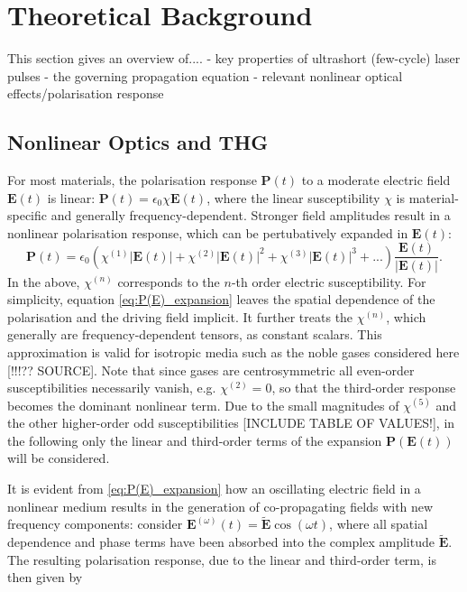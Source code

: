 \documentclass[a4paper]{jpconf}
\begin{document}
\section{Theoretical Background}
This section gives an overview of....
- key properties of ultrashort (few-cycle) laser pulses
- the governing propagation equation 
- relevant nonlinear optical effects/polarisation response

\subsection{Nonlinear Optics and THG}
For most materials, the polarisation response $\mathbf{P}(t)$ to a moderate electric field $\mathbf{E}(t)$ is linear: $\mathbf{P}(t) = \epsilon_0 \chi \mathbf{E}(t)$, where the linear susceptibility $\chi$ is material-specific and generally frequency-dependent. Stronger field amplitudes result in a nonlinear polarisation response, which can be pertubatively expanded in $\mathbf{E}(t)$:
\begin{equation}\label{eq:P(E)_expansion}
\mathbf{P}(t) = \epsilon_0 \left( \chi^{(1)}|\mathbf{E}(t)| + \chi^{(2)}|\mathbf{E}(t)|^2 +  \chi^{(3)}|\mathbf{E}(t)|^3 + ...  \right) \frac{\mathbf{E}(t)}{|\mathbf{E}(t)|}.
\end{equation}
In the above, $\chi^{(n)}$ corresponds to the $n$-th order electric susceptibility. For simplicity, equation \eqref{eq:P(E)_expansion} leaves the spatial dependence of the polarisation and the driving field implicit. It further treats the $\chi^{(n)}$, which generally are frequency-dependent tensors, as constant scalars. This approximation is valid for isotropic media such as the noble gases considered here [!!!?? SOURCE]. Note that since gases are centrosymmetric all even-order susceptibilities necessarily vanish, e.g. $\chi^{(2)}=0$, so that the third-order response becomes the dominant nonlinear term. Due to the small magnitudes of $\chi^{(5)}$ and the other higher-order odd susceptibilities [INCLUDE TABLE OF VALUES!], in the following only the linear and third-order terms of the expansion $\mathbf{P}(\mathbf{E}(t))$ will be considered. \par 
It is evident from \eqref{eq:P(E)_expansion} how an oscillating electric field in a nonlinear medium results in the generation of co-propagating fields with new frequency components: consider $\mathbf{E}^{(\omega)}(t) = \tilde{\mathbf{E}} \cos(\omega t)$, where all spatial dependence and phase terms have been absorbed into the complex amplitude  $\tilde{\mathbf{E}}$. The resulting polarisation response, due to the linear and third-order term, is then given by 
\end{document}
